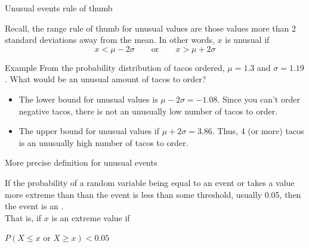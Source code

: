 \documentclass[xcolor=table]{beamer}
\begin{document}
\begin{frame}{Unusual events rule of thumb}
\begin{block}{}
Recall, the range rule of thumb for unusual values are those values more than 2 standard deviations away from the mean. In other words, $x$ is unusual if
\[ x < \mu - 2\sigma \qquad \text{or} \qquad x > \mu + 2 \sigma\]
\end{block}
\pause
\begin{exampleblock}{Example}
From the probability distribution of tacos ordered, $\mu = 1.3$ and $\sigma = 1.19$. What would be an unusual amount of tacos to order?
\begin{itemize}
\pause\item The lower bound for unusual values is $\mu - 2\sigma = -1.08$. Since you can't order negative tacos, there is not an unusually low number of tacos to order.
\pause\item The upper bound for unusual values if $\mu + 2\sigma = 3.86$. Thus, 4 (or more) tacos is an unusually high number of tacos to order.
\end{itemize}
\end{exampleblock}
\end{frame}

\begin{frame}{More precise definition for unusual events}
\begin{block}{}
If the probability of a random variable being equal to an event or takes a value more extreme than than the event is less than some threshold, usually 0.05, then the event is an .\\
\medskip
\pause
That is, if $x$ is an extreme value if\\\medskip
{\centering $P(X \le x \text{ or } X \ge x) < 0.05$ \par}
\pause{}
\pause{}
\end{block}
\end{frame}
\end{document}
